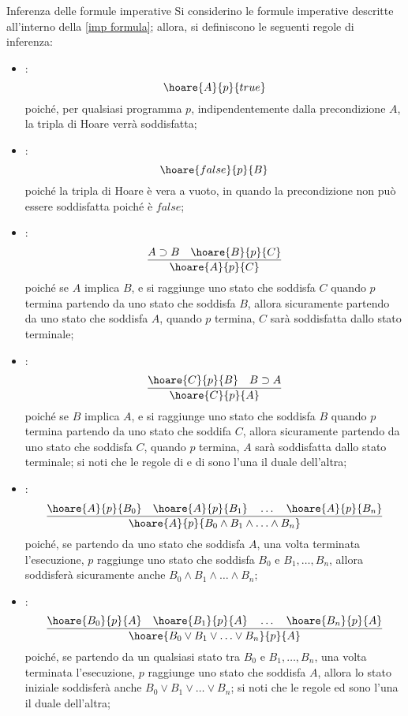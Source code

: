\documentclass[a4paper, 12pt]{report}
\begin{document}
    \begin{framedprop}{Inferenza delle formule imperative}
        Si considerino le formule imperative descritte all'interno della \cref{imp formula}; allora, si definiscono le seguenti regole di inferenza:

        \begin{itemize}
            \item {}: $$\hoare{A}{p}{true}$$ poiché, per qualsiasi programma $p$, indipendentemente dalla precondizione $A$, la tripla di Hoare verrà soddisfatta;
            \item {}: $$\hoare{false}{p}{B}$$ poiché la tripla di Hoare è vera a vuoto, in quando la precondizione non può essere soddisfatta poiché è $false$;
            \item {}: $$\dfrac{A \supset B \quad \hoare{B}{p}{C}}{\hoare{A}{p}{C}}$$ poiché se $A$ implica $B$, e si raggiunge uno stato che soddisfa $C$ quando $p$ termina partendo da uno stato che soddisfa $B$, allora sicuramente partendo da uno stato che soddisfa $A$, quando $p$ termina, $C$ sarà soddisfatta dallo stato terminale;
            \item {}: $$\dfrac{\hoare{C}{p}{B} \quad B \supset A}{\hoare{C}{p}{A}}$$ poiché se $B$ implica $A$, e si raggiunge uno stato che soddisfa $B$ quando $p$ termina partendo da uno stato che soddifa $C$, allora sicuramente partendo da uno stato che soddisfa $C$, quando $p$ termina, $A$ sarà soddisfatta dallo stato terminale; si noti che le regole di  e di  sono l'una il duale dell'altra;
            \item {}: $$\dfrac{\hoare{A}{p}{B_0} \quad \hoare{A}{p}{B_1} \quad \ldots \quad \hoare{A}{p}{B_n}}{\hoare{A}{p}{B_0 \land B_1 \land \ldots \land B_n}}$$ poiché, se partendo da uno stato che soddisfa $A$, una volta terminata l'esecuzione, $p$ raggiunge uno stato che soddisfa $B_0$ e $B_1, \ldots, B_n$, allora soddisferà sicuramente anche $B_0 \land B_1 \land \ldots \land B_n$;
            \item {}: $$\dfrac{\hoare{B_0}{p}{A} \quad \hoare{B_1}{p}{A} \quad \ldots \quad \hoare{B_n}{p}{A}}{\hoare{B_0 \lor B_1 \lor \ldots \lor B_n}{p}{A}}$$ poiché, se partendo da un qualsiasi stato tra $B_0$ e $B_1, \ldots, B_n$, una volta terminata l'esecuzione, $p$ raggiunge uno stato che soddisfa $A$, allora lo stato iniziale soddisferà anche $B_0 \lor B_1 \lor \ldots \lor B_n$; si noti che le regole  ed  sono l'una il duale dell'altra;
        \end{itemize}
    \end{framedprop}
\end{document}

